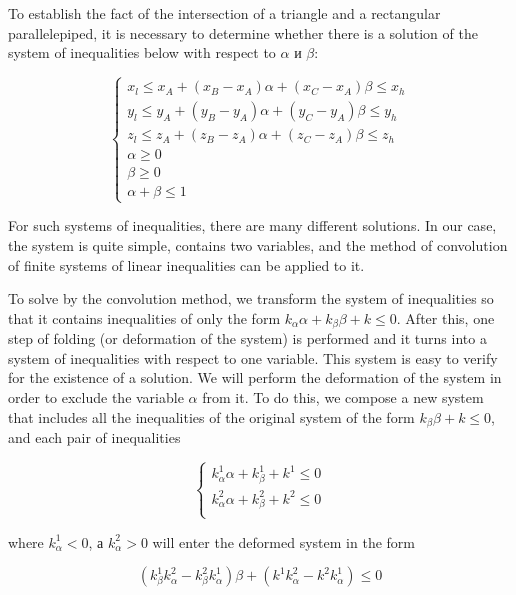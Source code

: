 \documentclass[
11pt,%
tightenlines,%
twoside,%
onecolumn,%
nofloats,%
nobibnotes,%
nofootinbib,%
superscriptaddress,%
noshowpacs,%
centertags]%
{revtex4}
\begin{document}
To establish the fact of the intersection of a triangle and a rectangular parallelepiped, it is necessary to determine whether there is a solution of the system of inequalities below with respect to $\alpha$ и $\beta$:

\begin{equation}
\begin{cases}
x_l \le x_A + (x_B - x_A)\alpha + (x_C - x_A)\beta \le x_h \\
y_l \le y_A + (y_B - y_A)\alpha + (y_C - y_A)\beta \le y_h \\
z_l \le z_A + (z_B - z_A)\alpha + (z_C - z_A)\beta \le z_h \\
\alpha \ge 0 \\
\beta \ge 0 \\
\alpha + \beta \le 1
\end{cases}
\end{equation}

For such systems of inequalities, there are many different solutions.
In our case, the system is quite simple, contains two variables, and the method of convolution of finite systems of linear inequalities can be applied to it.

To solve by the convolution method, we transform the system of inequalities so that it contains inequalities of only the form $k_{\alpha}\alpha + k_{\beta}\beta + k \le 0$.
After this, one step of folding (or deformation of the system) is performed and it turns into a system of inequalities with respect to one variable.
This system is easy to verify for the existence of a solution.
We will perform the deformation of the system in order to exclude the variable $\alpha$ from it.
To do this, we compose a new system that includes all the inequalities of the original system of the form $k_{\beta}\beta + k \le 0$, and each pair of inequalities

\begin{equation}
\begin{cases}
k_{\alpha}^1 \alpha + k_{\beta}^1 + k^1 \le 0 \\
k_{\alpha}^2 \alpha + k_{\beta}^2 + k^2 \le 0 \\
\end{cases}
\end{equation}

where $k_{\alpha}^1 < 0$, а $k_{\alpha}^2 > 0$ will enter the deformed system in the form

\begin{equation}
(k_{\beta}^1 k_{\alpha}^2 - k_{\beta}^2 k_{\alpha}^1)\beta + (k^1 k_{\alpha}^2 - k^2 k_{\alpha}^1) \le 0
\end{equation}
\end{document}
